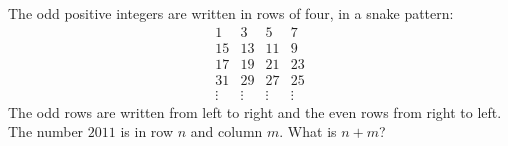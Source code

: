 The odd positive integers are written in rows of four, in a snake pattern:
\[
\begin{array}{cccc}
1&3&5&7\\
15&13&11&9\\
17&19&21&23\\
31&29&27&25\\
\vdots&\vdots&\vdots&\vdots
\end{array}
\]
The odd rows are written from left to right and the even rows from right to left. The number $2011$ is in row $n$ and column $m$. What is $n+m$?
